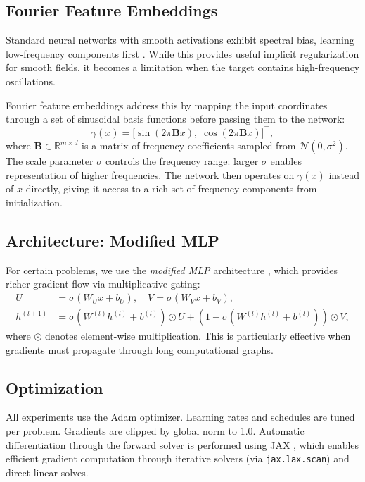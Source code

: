 \documentclass[11pt]{article}
\newcommand{\R}{\mathbb{R}}
\newcommand{\mat}[1]{\mathbf{#1}}
\begin{document}
\subsection{Fourier Feature Embeddings}

Standard neural networks with smooth activations exhibit spectral bias, learning low-frequency components first \citep{rahaman2019spectral}. While this provides useful implicit regularization for smooth fields, it becomes a limitation when the target contains high-frequency oscillations.

Fourier feature embeddings \citep{tancik2020fourier} address this by mapping the input coordinates through a set of sinusoidal basis functions before passing them to the network:
\begin{equation}
  \gamma(x) = \bigl[\sin(2\pi \mat{B} x), \; \cos(2\pi \mat{B} x)\bigr]^\top,
  \label{eq:fourier_features}
\end{equation}
where $\mat{B} \in \R^{m \times d}$ is a matrix of frequency coefficients sampled from $\mathcal{N}(0, \sigma^2)$. The scale parameter $\sigma$ controls the frequency range: larger $\sigma$ enables representation of higher frequencies. The network then operates on $\gamma(x)$ instead of $x$ directly, giving it access to a rich set of frequency components from initialization.

\subsection{Architecture: Modified MLP}

For certain problems, we use the \emph{modified MLP} architecture \citep{wang2021eigenvector}, which provides richer gradient flow via multiplicative gating:
\begin{align}
  U &= \sigma(W_U x + b_U), \quad V = \sigma(W_V x + b_V), \\
  h^{(l+1)} &= \sigma(W^{(l)} h^{(l)} + b^{(l)}) \odot U + (1 - \sigma(W^{(l)} h^{(l)} + b^{(l)})) \odot V,
\end{align}
where $\odot$ denotes element-wise multiplication. This is particularly effective when gradients must propagate through long computational graphs.

\subsection{Optimization}

All experiments use the Adam optimizer. Learning rates and schedules are tuned per problem. Gradients are clipped by global norm to 1.0. Automatic differentiation through the forward solver is performed using JAX \citep{jax2018github}, which enables efficient gradient computation through iterative solvers (via \texttt{jax.lax.scan}) and direct linear solves.
\end{document}
